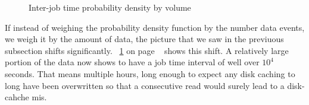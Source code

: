 \begin{figure}
\centering
{}
\hspace{0mm}
\caption{Inter-job time probability density by volume}
\label{fig:InterJobBySize}
\end{figure}
If instead of weighing the probability density function by the number data events, we weigh it by the amount of data, the picture that we saw in the previuous subsection shifts significantly. ~\ref{fig:InterJobBySize} on page ~\pageref{fig:InterjobBySize} shows this shift. A relatively large portion of the data now shows to have a job time interval of well over $10^4$ seconds. That means multiple hours, long enough to expect any disk caching to long have been overwritten so that a consecutive read would surely lead to a disk-cahche mis.
